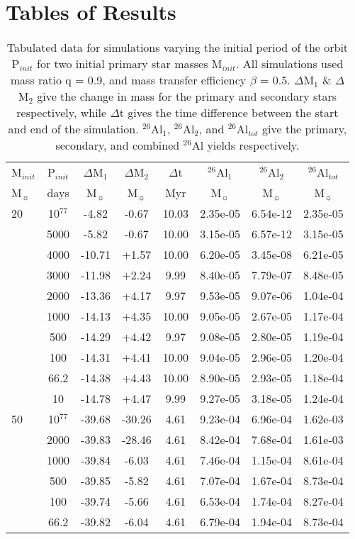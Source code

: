 \section{Tables of Results}

\begin{table*}
 \caption{Tabulated data for simulations varying the initial period of the orbit P$_{init}$ for two initial primary star masses M$_{init}$.
 All simulations used mass ratio q = 0.9, and mass transfer efficiency $\beta$ = 0.5.
 $\Delta$M$_1$ \& $\Delta$M$_2$ give the change in mass for the primary and secondary stars respectively, while $\Delta$t gives the time difference between the start and end of the simulation.
  $^{26}$Al$_1$, $^{26}$Al$_2$, and $^{26}$Al$_{tot}$ give the primary, secondary, and combined $^{26}$Al yields respectively.
 }
 \label{tab:data1}
 \begin{tabular}{lccccccc}
  \hline
  M$_{init}$ & P$_{init}$ & $\Delta$M$_1$ & $\Delta$M$_2$ & $\Delta$t & $^{26}$Al$_1$ & $^{26}$Al$_2$ & $^{26}$Al$_{tot}$ \\
  M$_{\sun}$ & days & M$_{\sun}$ & M$_{\sun}$  & Myr & M$_{\sun}$ & M$_{\sun}$ & M$_{\sun}$ \\
  \hline
  20 & 10$^{77}$ & -4.82 & -0.67 & 10.03 & 2.35e-05 & 6.54e-12 & 2.35e-05 \\
   & 5000 & -5.82 & -0.67 & 10.00 & 3.15e-05 & 6.57e-12 & 3.15e-05 \\
   & 4000 & -10.71 & +1.57 & 10.00 & 6.20e-05 & 3.45e-08 & 6.21e-05 \\
   & 3000 & -11.98 & +2.24 & 9.99 & 8.40e-05 & 7.79e-07 & 8.48e-05 \\
   & 2000 & -13.36 & +4.17 & 9.97 & 9.53e-05 & 9.07e-06 & 1.04e-04 \\
   & 1000 & -14.13 & +4.35 & 10.00 & 9.05e-05 & 2.67e-05 & 1.17e-04 \\
   & 500 & -14.29 & +4.42 & 9.97 & 9.08e-05 & 2.80e-05 & 1.19e-04 \\
   & 100 & -14.31 & +4.41 & 10.00 & 9.04e-05 & 2.96e-05 & 1.20e-04 \\
   & 66.2 & -14.38 & +4.43 & 10.00 & 8.90e-05 & 2.93e-05 & 1.18e-04 \\
   & 10 & -14.78 & +4.47 & 9.99 & 9.27e-05 & 3.18e-05 & 1.24e-04 \\
  \hline
  50 & 10$^{77}$ & -39.68 & -30.26 & 4.61 & 9.23e-04 & 6.96e-04 & 1.62e-03 \\
   & 2000 & -39.83 & -28.46 & 4.61 & 8.42e-04 & 7.68e-04 & 1.61e-03 \\
   & 1000 & -39.84 & -6.03 & 4.61 & 7.46e-04 & 1.15e-04 & 8.61e-04 \\
   & 500 & -39.85 & -5.82 & 4.61 & 7.07e-04 & 1.67e-04 & 8.73e-04 \\
   & 100 & -39.74 & -5.66 & 4.61 & 6.53e-04 & 1.74e-04 & 8.27e-04 \\
   & 66.2 & -39.82 & -6.04 & 4.61 & 6.79e-04 & 1.94e-04 & 8.73e-04 \\
  \hline
 \end{tabular}
\end{table*}

